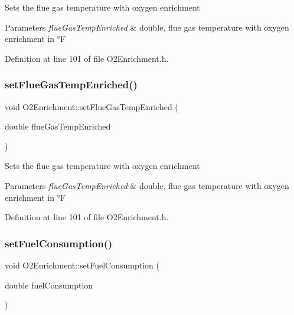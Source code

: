 Sets the flue gas temperature with oxygen enrichment 
\begin{DoxyParams}{Parameters}
{\em flue\+Gas\+Temp\+Enriched} & double, flue gas temperature with oxygen enrichment in °F \\
\hline
\end{DoxyParams}


Definition at line 101 of file O2\+Enrichment.\+h.

\mbox{\label{class_o2_enrichment_a787af9e47a73f2416d6c5d23aaf6d659}} 
\subsubsection{\texorpdfstring{set\+Flue\+Gas\+Temp\+Enriched()}{setFlueGasTempEnriched()}\hspace{0.1cm}{\footnotesize\ttfamily [3/3]}}
{\footnotesize\ttfamily void O2\+Enrichment\+::set\+Flue\+Gas\+Temp\+Enriched (\begin{DoxyParamCaption}\item[{double}]{flue\+Gas\+Temp\+Enriched }\end{DoxyParamCaption})\hspace{0.3cm}{\ttfamily [inline]}}

Sets the flue gas temperature with oxygen enrichment 
\begin{DoxyParams}{Parameters}
{\em flue\+Gas\+Temp\+Enriched} & double, flue gas temperature with oxygen enrichment in °F \\
\hline
\end{DoxyParams}


Definition at line 101 of file O2\+Enrichment.\+h.

\mbox{\label{class_o2_enrichment_ae2b7ed0ecf7b71b2a68f488c7760efaf}} 
\subsubsection{\texorpdfstring{set\+Fuel\+Consumption()}{setFuelConsumption()}\hspace{0.1cm}{\footnotesize\ttfamily [1/3]}}
{\footnotesize\ttfamily void O2\+Enrichment\+::set\+Fuel\+Consumption (\begin{DoxyParamCaption}\item[{double}]{fuel\+Consumption }\end{DoxyParamCaption})\hspace{0.3cm}{\ttfamily [inline]}}


